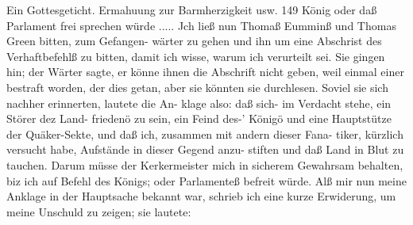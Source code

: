 Ein Gottesgeticht. Ermahuung zur Barmherzigkeit usw. 149
König oder daß Parlament frei sprechen würde ..... Jch ließ
nun Thomaß Eumminß und Thomas Green bitten, zum Gefangen-
wärter zu gehen und ihn um eine Abschrist des Verhaftbefehlß zu
bitten, damit ich wisse, warum ich verurteilt sei. Sie gingen hin;
der Wärter sagte, er könne ihnen die Abschrift nicht geben, weil
einmal einer bestraft worden, der dies getan, aber sie könnten sie
durchlesen. Soviel sie sich nachher erinnerten, lautete die An-
klage also: daß sich- im Verdacht stehe, ein Störer dez Land-
friedenö zu sein, ein Feind des-’ Königö und eine Hauptstütze der
Quäker-Sekte, und daß ich, zusammen mit andern dieser Fana-
tiker, kürzlich versucht habe, Aufstände in dieser Gegend anzu-
stiften und daß Land in Blut zu tauchen. Darum müsse der
Kerkermeister mich in sicherem Gewahrsam behalten, biz ich auf
Befehl des Königs; oder Parlamenteß befreit würde.
Alß mir nun meine Anklage in der Hauptsache bekannt war,
schrieb ich eine kurze Erwiderung, um meine Unschuld zu zeigen;
sie lautete:

